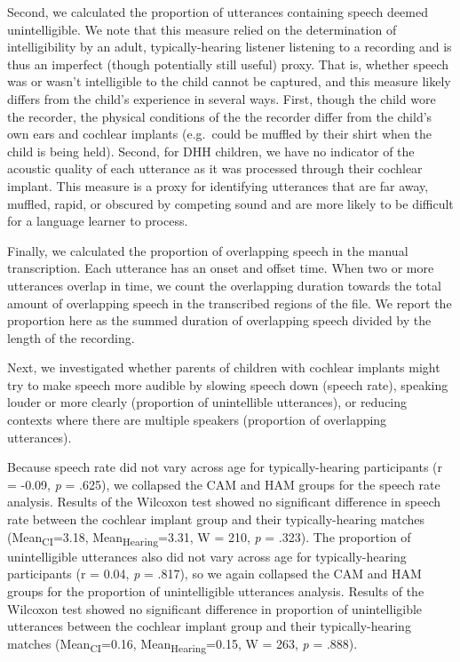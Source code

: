 \documentclass[
  man,floatsintext]{apa6}
\begin{document}
Second, we calculated the proportion of utterances containing speech deemed unintelligible. We note that this measure relied on the determination of intelligibility by an adult, typically-hearing listener listening to a recording and is thus an imperfect (though potentially still useful) proxy. That is, whether speech was or wasn't intelligible to the child cannot be captured, and this measure likely differs from the child's experience in several ways. First, though the child wore the recorder, the physical conditions of the the recorder differ from the child's own ears and cochlear implants (e.g.~could be muffled by their shirt when the child is being held). Second, for DHH children, we have no indicator of the acoustic quality of each utterance as it was processed through their cochlear implant. This measure is a proxy for identifying utterances that are far away, muffled, rapid, or obscured by competing sound and are more likely to be difficult for a language learner to process.

Finally, we calculated the proportion of overlapping speech in the manual transcription. Each utterance has an onset and offset time. When two or more utterances overlap in time, we count the overlapping duration towards the total amount of overlapping speech in the transcribed regions of the file. We report the proportion here as the summed duration of overlapping speech divided by the length of the recording.

Next, we investigated whether parents of children with cochlear implants might try to make speech more audible by slowing speech down (speech rate), speaking louder or more clearly (proportion of unintellible utterances), or reducing contexts where there are multiple speakers (proportion of overlapping utterances).

Because speech rate did not vary across age for typically-hearing participants (r = -0.09, \emph{p} = .625), we collapsed the CAM and HAM groups for the speech rate analysis. Results of the Wilcoxon test showed no significant difference in speech rate between the cochlear implant group and their typically-hearing matches (Mean\textsubscript{CI}=3.18, Mean\textsubscript{Hearing}=3.31, W = 210, \emph{p} = .323). The proportion of unintelligible utterances also did not vary across age for typically-hearing participants (r = 0.04, \emph{p} = .817), so we again collapsed the CAM and HAM groups for the proportion of unintelligible utterances analysis. Results of the Wilcoxon test showed no significant difference in proportion of unintelligible utterances between the cochlear implant group and their typically-hearing matches (Mean\textsubscript{CI}=0.16, Mean\textsubscript{Hearing}=0.15, W = 263, \emph{p} = .888).
\end{document}
